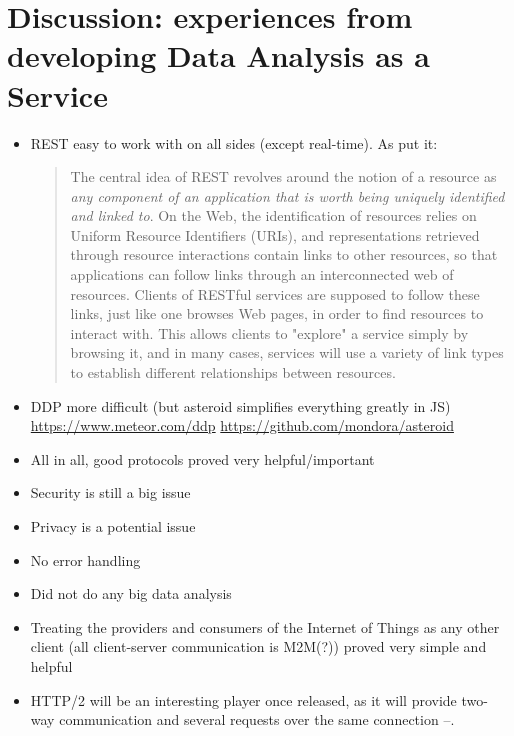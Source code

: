 \section{Discussion: experiences from developing Data Analysis as a Service}
\begin{itemize}
    \item REST easy to work with on all sides (except real-time). As     \textcite{uckelmann-harrison-michahelles:architecting-the-internet-of-things:2011} put it:

    \blockquote{The central idea of REST revolves around the notion of a resource as \textit{any component of an application that is worth being uniquely identified and linked to}. On the Web, the identification of resources relies on Uniform Resource Identifiers (URIs), and representations retrieved through resource interactions contain links to other resources, so that applications can follow links through an interconnected web of resources. Clients of RESTful services are supposed to follow these links, just like one browses Web pages, in order to find resources to interact with. This allows clients to "explore" a service simply by browsing it, and in many cases, services will use a variety of link types to establish different relationships between resources.}

    \item DDP more difficult (but asteroid simplifies everything greatly in JS) \url{https://www.meteor.com/ddp} \url{https://github.com/mondora/asteroid}
    \item All in all, good protocols proved very helpful/important
    \item Security is still a big issue
    \item Privacy is a potential issue
    \item No error handling
    \item Did not do any big data analysis
    \item Treating the providers and consumers of the Internet of Things as any other client (all client-server communication is M2M(?)) proved very simple and helpful
    \item HTTP/2 will be an interesting player once released, as it will provide two-way communication and several requests over the same connection –. 
\end{itemize}
